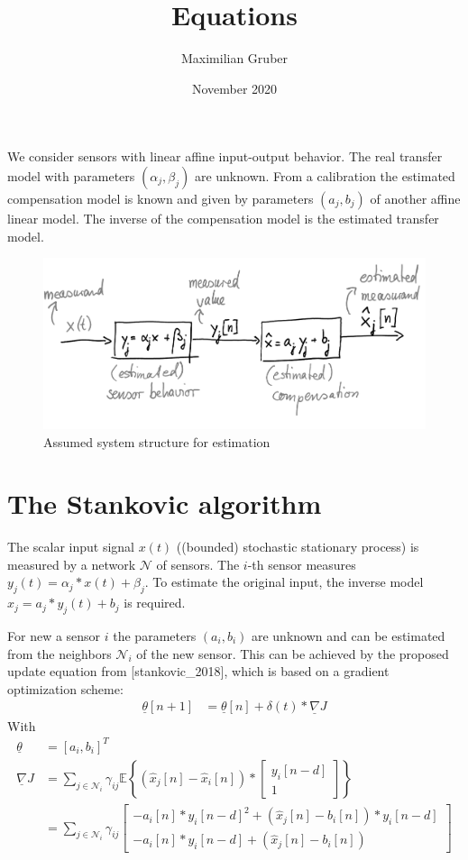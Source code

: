 \documentclass[10pt,a4paper,onecolumn]{article}
\title{Equations}
\author{Maximilian Gruber}    %
\date{November 2020}
\renewcommand{\vec}[1]{\underline{#1}}
\begin{document}
    \maketitle
    We consider sensors with linear affine input-output behavior. The real transfer model with parameters $(\alpha_j, \beta_j)$ are unknown. From a calibration the estimated compensation model is known and given by parameters $(a_j, b_j)$ of another affine linear model. The inverse of the compensation model is the estimated transfer model. 
    \begin{figure}[h]
        \centering
        \includegraphics[width=0.9\linewidth]{system_description.png}
        \caption{Assumed system structure for estimation}
        \label{fig:system_description}
    \end{figure}
    
    \section{The Stankovic algorithm}
    The scalar input signal $x(t)$ ((bounded) stochastic stationary process) is measured by a network $\mathcal{N}$ of sensors. The $i$-th sensor measures $y_j(t) = \alpha_j * x(t) + \beta_j$. To estimate the original input, the inverse model $\hat{x}_j = a_j * y_j(t) + b_j$ is required. 
    
    For new a sensor $i$ the parameters $(a_i, b_i)$ are unknown and can be estimated from the neighbors $\mathcal{N}_i$ of the new sensor. This can be achieved by the proposed update equation from [stankovic\_2018], which is based on a gradient optimization scheme:
    \begin{align}
        \vec{\theta}[n+1] &= \vec{\theta}[n] + \delta(t) * \vec{\nabla} J
    \end{align}
    With
    \begin{align}
        \vec{\theta} &= [ a_i, b_i ]^T \\
        \vec{\nabla} J &=  \sum_{j \in \mathcal{N}_i} \gamma_{ij} \mathbb{E}\left\{ ( \hat{x}_j[n] - \hat{x}_i[n]) *
            \begin{bmatrix} y_i[n-d] \\ 1 \end{bmatrix} \right\} \nonumber \\
        &= \sum_{j \in \mathcal{N}_i} \gamma_{ij} \begin{bmatrix} - a_i[n]*{y_i[n-d]}^2 + (\hat{x}_j[n] - b_i[n]) * y_i[n-d]\\ - a_i[n]*y_i[n-d] + (\hat{x}_j[n] - b_i[n]) \end{bmatrix}
    \end{align}
    
\end{document}
